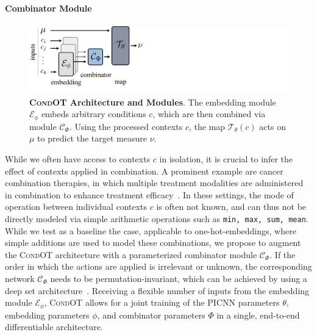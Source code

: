 \paragraph{Combinator Module}
\begin{figure}
    \centering
    \includegraphics[width=.4\textwidth]{figures/fig_architecture.pdf}
    \caption{\textbf{\textsc{CondOT} Architecture and Modules}. The embedding module $\mathcal{E}_\phi$ embeds arbitrary conditions $c$, which are then combined via module $\mathcal{C}_\Phi$. Using the processed contexts $c$, the map $\mathcal{T}_\theta(c)$ acts on $\mu$ to predict the target measure $\nu$.}\vskip-0.5cm
    \label{fig:architecture}
\end{figure}
 While we often have access to contexts $c$ in isolation, it is crucial to infer the effect of contexts applied in combination. A prominent example are cancer combination therapies, in which multiple treatment modalities are administered in combination to enhance treatment efficacy~\citep{kummar2010utilizing}.
In these settings, the mode of operation between individual contexts $c$ is often not known, and can thus not be directly modeled via simple arithmetic operations such as 
\texttt{min, max, sum, mean}.
While we test as a baseline the case, applicable to one-hot-embeddings, where simple additions are used to model these combinations, we propose to augment the \textsc{CondOT} architecture with a parameterized combinator module $\mathcal{C}_\Phi$.
If the order in which the actions are applied is irrelevant or unknown, the corresponding network $\mathcal{C}_\Phi$ needs to be permutation-invariant,
which can be achieved by using a deep set architecture~\citep{zaheer2017}.
Receiving a flexible number of inputs from the embedding module $\mathcal{E}_\phi$, \textsc{CondOT} allows for a joint training of the PICNN parameters $\theta$, embedding parameters $\phi$, and combinator parameters $\Phi$ in a single, end-to-end differentiable architecture.

